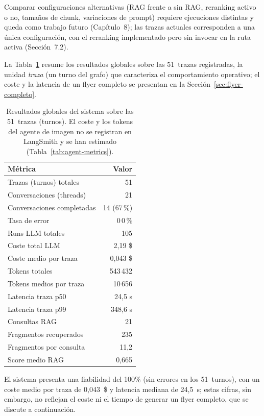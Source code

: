Comparar configuraciones alternativas (RAG frente a sin RAG, reranking activo o no, tamaños de chunk, variaciones de prompt) requiere ejecuciones distintas y queda como trabajo futuro (Capítulo~8); las trazas actuales corresponden a una única configuración, con el reranking implementado pero sin invocar en la ruta activa (Sección~7.2).

La Tabla~\ref{tab:global-results} resume los resultados globales sobre las 51~trazas registradas, la unidad \textit{traza} (un turno del grafo) que caracteriza el comportamiento operativo; el coste y la latencia de un flyer completo se presentan en la Sección~\ref{sec:flyer-completo}.

\begin{table}[htbp]
\centering
\fontsize{10}{12}\selectfont
\begin{tabular}{lr}
\toprule
Métrica & Valor \\
\midrule
Trazas (turnos) totales & 51 \\
Conversaciones (threads) & 21 \\
Conversaciones completadas & 14 (67\,\%) \\
Tasa de error & 0\,0\,\% \\
Runs LLM totales & 105 \\
Coste total LLM & 2{,}19 \$ \\
Coste medio por traza & 0{,}043 \$ \\
Tokens totales & 543\,432 \\
Tokens medios por traza & 10\,656 \\
Latencia traza p50 & 24{,}5 s \\
Latencia traza p99 & 348{,}6 s \\
\midrule
Consultas RAG & 21 \\
Fragmentos recuperados & 235 \\
Fragmentos por consulta & 11{,}2 \\
Score medio RAG & 0{,}665 \\
\bottomrule
\end{tabular}
\caption{Resultados globales del sistema sobre las 51~trazas (turnos). El coste y los tokens del agente de imagen no se registran en LangSmith y se han estimado (Tabla~\ref{tab:agent-metrics}).}
\label{tab:global-results}
\end{table}

El sistema presenta una fiabilidad del 100\% (sin errores en los 51~turnos), con un coste medio por traza de 0{,}043~\$ y latencia mediana de 24{,}5~s; estas cifras, sin embargo, no reflejan el coste ni el tiempo de generar un flyer completo, que se discute a continuación.

